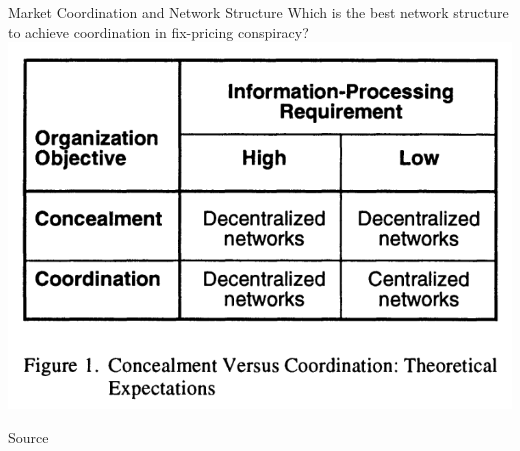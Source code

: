 \documentclass[notes, aspectratio=1610]{beamer}
\begin{document}
\begin{frame}{Market Coordination and Network Structure}
	{Which is the best network structure to achieve coordination in fix-pricing conspiracy?}
	\centering
	\includegraphics[height=.8\textheight]{images/two_by_two.png}

	\raggedleft Source~\cite[][page 845]{baker_faulkner_1993}
\end{frame}
\end{document}
